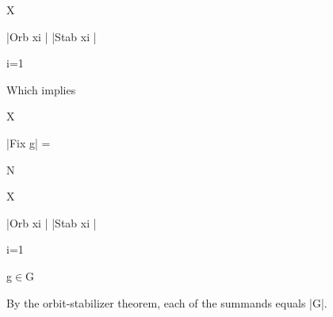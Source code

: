 \documentclass[a4paper,portrait,12pt]{article}
\begin{document}
\begin{flushleft}
X
\end{flushleft}





\begin{flushleft}
|Orb xi | |Stab xi |
\end{flushleft}





\begin{flushleft}
i=1
\end{flushleft}





\begin{flushleft}
Which implies
\end{flushleft}


\begin{flushleft}
X
\end{flushleft}





\begin{flushleft}
|Fix g| =
\end{flushleft}





\begin{flushleft}
N
\end{flushleft}


\begin{flushleft}
X
\end{flushleft}





\begin{flushleft}
|Orb xi | |Stab xi |
\end{flushleft}





\begin{flushleft}
i=1
\end{flushleft}





\begin{flushleft}
g$\in$G
\end{flushleft}





\begin{flushleft}
By the orbit-stabilizer theorem, each of the summands equals |G|.
\end{flushleft}
\end{document}
